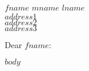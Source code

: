 \documentclass{otsletter}
\date{$date$}
\begin{document}
\begin{letter}{$fname$ $mname$ $lname$\\$address1$\\$address2$\\$address3$\\}
\opening{Dear $fname$:}
$body$
\end{letter}
\end{document}
